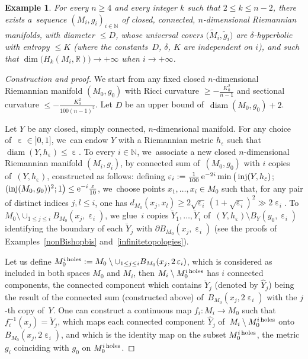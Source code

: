 \documentclass[pdftex]{sigma}
\numberwithin{equation}{section}
\newtheorem{exa}[theor]{Example}
\newcommand{\N}{\mathbb{N}}
\newcommand{\R}{\mathbb{R}}
\newcommand{\f}{\rightarrow}
\newcommand{\diam}{\operatorname{diam}}
\newcommand{\inj}{\operatorname{inj}}
\newcommand{\e}{\operatorname{\varepsilon}}
\begin{document}
\begin{exa}\label{infiniteBetti}
For every $n \ge 4$ and every integer $k$ such that $ 2 \le k \le n-2$, there exists a~sequence $(M_i, g_i)_{i \in \N}$
of closed, connected, $n$-dimensional Riemannian manifolds, with diameter
$\le D$, whose universal covers $\big(\widetilde M_i, \tilde g_i\big)$ are $\delta$-hyperbolic with entropy $ \le K$ (where the constants~$D$, $\delta$, $K$ are independent on $i$), and such that $\dim \big( H_k (M_i, \R) \big) \f
+ \infty$ when
$i \f +\infty$.
\end{exa}

\begin{proof}[Construction and proof]
We start from any fixed closed $n$-dimensional Riemannian manifold $(M_0,
g_0)$ with Ricci curvature $\ge - \frac{K_0^2}{n-1}$ and
sectional curvature $\le - \frac{K_0^2}{100 (n-1)^2}$. Let $D$ be an upper bound of~$\diam (M_0, g_0) + 2$.

Let $Y$ be any closed, simply connected, $n$-dimensional manifold. For any choice of~$\e \in{} ]0, 1]$, we~can endow $Y$ with a Riemannian metric
$h_{\e}$ such that
$\diam (Y, h_{\e}) \le \e$. To every $i \in \N$, we~associate a new closed $n$-dimensional Riemannian manifold $(M_i, g_i)$, by connected sum of~$(M_0, g_0)$ with $i$ copies of~$(Y, h_{\e})$, constructed as follows: defining $\e_i := \frac{1}{100}\, {\rm e}^{- 2 i } \min \big( \inj (Y, h_{\e})$;
$(\inj (M_0, g_0))^2; 1 \big) \le {\rm e}^{-i } \frac{\e}{10}$, we~choose points $x_1, \dots, x_i \in M_0$ such that, for any pair of distinct indices $j,
l \le i$, one has
$d_{M_0} (x_j, x_l) \ge 2 \sqrt{\e_i} \, (1 + \sqrt{\e_i})^2 \gg 2 \e_i$. To $ M_0 \setminus \cup_{1 \le j \le i} B_{M_0} (x_j, \e_i)$, we glue~$i$ copies
$\breve Y_1, \dots, \breve Y_i$ of~$(Y, h_{\e}) \setminus B_{Y} (y_0, \e_i)$ identifying the boundary of each $\breve Y_j$ with $\partial B_{M_0} (x_j, \e_i)$ (see the proofs of Examples~\ref{nonBishopbis} and~\ref{infinitetopologies}).

Let us define $M_0^{i {\rm \, holes}}:= M_0 \setminus \cup_{1 \le j \le
i} B_{M_0} (x_j, 2 \e_i)$, which is considered as included in both spaces $M_0$
and $M_i$, then $M_i \setminus M_0^{i {\rm \, holes}} $ has $i$ connected
components, the connected component which contains $\breve Y_j $ (denoted
by $\widehat Y_j$) being the result of the connected sum (constructed above) of~$ B_{M_0} (x_j, 2 \e_i)$ with the $j$-th copy of~$Y$.
One can construct a continuous map $f_i \colon M_i \f M_0$ such that $f_i^{-1} (x_j) = \breve Y_j $, which maps each connected component $\widehat Y_j$
of~$M_i \setminus M_0^{i {\rm \, holes}}$ onto $B_{M_0} (x_j, 2 \e_i)$,
and which is the identity map on the subset $M_0^{i {\rm \, holes}}$, the
metric $g_i$ coinciding with $g_0$ on $M_0^{i {\rm \, holes}}$.


\end{proof}
\end{document}
